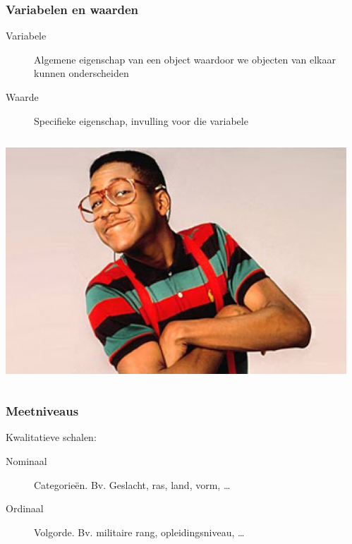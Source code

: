 \documentclass{beamer}
\begin{document}
\begin{frame}
  \frametitle{Variabelen en waarden}

  \begin{description}
    \item[Variabele] Algemene eigenschap van een object waardoor we objecten van elkaar kunnen onderscheiden
    \item[Waarde] Specifieke eigenschap, invulling voor die variabele
  \end{description}

  \vspace{1cm}

  \begin{columns}[c]
    \includegraphics[width=\textwidth]{img/les1-07}

    \\
    \vspace{.5cm}
    \\
    \vspace{.5cm}

  \end{columns}
\end{frame}

\begin{frame}
  \frametitle{Meetniveaus}

  Kwalitatieve schalen:

  \begin{description}
    \item[Nominaal] Categorieën. Bv. Geslacht, ras, land, vorm, \ldots
    \item[Ordinaal] Volgorde. Bv. militaire rang, opleidingsniveau, \ldots
  \end{description}

\end{frame}
\end{document}
